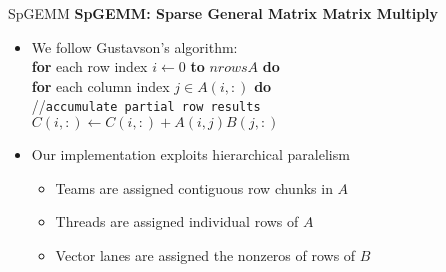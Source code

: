 \begin{frame}[fragile]{SpGEMM}
\textbf{SpGEMM: Sparse General Matrix Matrix Multiply}

\begin{itemize}

  \item We follow Gustavson's algorithm: \\
   \hspace{0.4cm}   \textbf{for} each row index $i\gets 0$  \textbf{to} $nrowsA$ \textbf{do} \\
   \hspace{0.8cm} 	   \textbf{for} each column index $j\in A(i,:)$ \textbf{do} \\
   \hspace{1.2cm}	     	//\texttt{accumulate partial row results}\\
   \hspace{1.2cm}	     	$C(i,:) \gets C(i,:) + A(i,j)B(j,:)$
   
  \vspace{.4cm}
  \item Our implementation exploits hierarchical paralelism
  \begin{itemize}
  	\item Teams are assigned contiguous row chunks in $A$  
      	\item Threads are assigned individual rows of $A$
        \item Vector lanes are assigned the nonzeros of rows of $B$
  \end{itemize} 


 \end{itemize}  
\end{frame}

